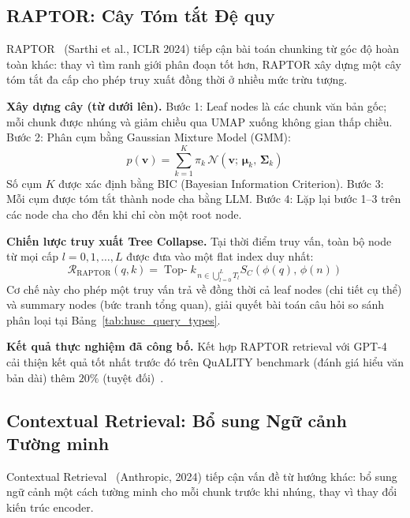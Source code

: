 \documentclass[12pt,a4paper]{report}
\theoremstyle{plain}
\theoremstyle{definition}
\begin{document}
	\subsection{RAPTOR: Cây Tóm tắt Đệ quy}
	\label{subsec:raptor}
	
	RAPTOR~\cite{sarthi2024raptor} (Sarthi et al., ICLR 2024) tiếp cận bài toán
	chunking từ góc độ hoàn toàn khác: thay vì tìm ranh giới phân đoạn tốt hơn,
	RAPTOR xây dựng một cây tóm tắt đa cấp cho phép truy xuất đồng thời ở nhiều
	mức trừu tượng.
	
	\textbf{Xây dựng cây (từ dưới lên).} Bước 1: Leaf nodes là các chunk văn
	bản gốc; mỗi chunk được nhúng và giảm chiều qua UMAP xuống không gian thấp
	chiều. Bước 2: Phân cụm bằng Gaussian Mixture Model (GMM):
	\begin{equation}
		p(\mathbf{v}) = \sum_{k=1}^{K} \pi_k\,
		\mathcal{N}(\mathbf{v};\, \boldsymbol{\mu}_k,\, \boldsymbol{\Sigma}_k)
		\label{eq:gmm}
	\end{equation}
	Số cụm $K$ được xác định bằng BIC (Bayesian Information Criterion). Bước
	3: Mỗi cụm được tóm tắt thành node cha bằng LLM. Bước 4: Lặp lại bước 1--3
	trên các node cha cho đến khi chỉ còn một root node.
	
	\textbf{Chiến lược truy xuất Tree Collapse.} Tại thời điểm truy vấn, toàn
	bộ node từ mọi cấp $l = 0, 1, \ldots, L$ được đưa vào một flat index duy
	nhất:
	\begin{equation}
		\mathcal{R}_{\text{RAPTOR}}(q, k) =
		\operatorname{Top-}k_{\,n \in \bigcup_{l=0}^L T_l}
		S_C(\phi(q),\, \phi(n))
		\label{eq:raptor_collapse}
	\end{equation}
	Cơ chế này cho phép một truy vấn trả về đồng thời cả leaf nodes (chi tiết
	cụ thể) và summary nodes (bức tranh tổng quan), giải quyết bài toán câu
	hỏi so sánh phân loại tại Bảng~\ref{tab:husc_query_types}.
	
	\textbf{Kết quả thực nghiệm đã công bố.} Kết hợp RAPTOR retrieval với
	GPT-4 cải thiện kết quả tốt nhất trước đó trên QuALITY benchmark (đánh
	giá hiểu văn bản dài) thêm $20\%$ (tuyệt đối)~\cite{sarthi2024raptor}.
	
	\subsection{Contextual Retrieval: Bổ sung Ngữ cảnh Tường minh}
	\label{subsec:contextual_retrieval}
	
	Contextual Retrieval~\cite{anthropic2024contextual} (Anthropic, 2024) tiếp
	cận vấn đề từ hướng khác: bổ sung ngữ cảnh một cách tường minh cho mỗi
	chunk trước khi nhúng, thay vì thay đổi kiến trúc encoder.
	
\end{document}
